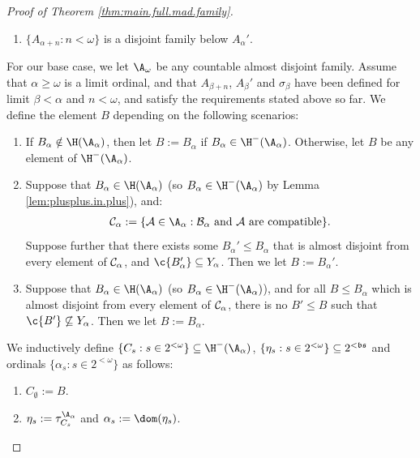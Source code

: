 \documentclass[11pt,reqno]{amsart}
\begin{document}
\begin{proof}[Proof of Theorem \ref{thm:main.full.mad.family}]
\begin{enumerate}
        \item $\{A_{\alpha+n} : n < \omega\}$ is a disjoint family below $A_\alpha'$.
    \end{enumerate}
    For our base case, we let $\A_\omega$ be any countable almost disjoint family. Assume that $\alpha \geq \omega$ is a limit ordinal, and that $A_{\beta+n}$, $A_\beta'$ and $\sigma_\beta$ have been defined for limit $\beta < \alpha$ and $n < \omega$, and satisfy the requirements stated above so far. We define the element $B$ depending on the following scenarios:
    \begin{enumerate}[label=(\alph*)]
        \item If $B_\alpha \notin \H(\A_\alpha)$, then let $B := B_\alpha$ if $B_\alpha \in \H^-(\A_\alpha)$. Otherwise, let $B$ be any element of $\H^-(\A_\alpha)$.

        \item Suppose that $B_\alpha \in \H(\A_\alpha)$ (so $B_\alpha \in \H^-(\A_\alpha)$ by Lemma \ref{lem:plusplus.in.plus}), and:
        \begin{align*}
            \cal{C}_\alpha := \{A \in \A_\alpha : B_\alpha \text{ and } A \text{ are compatible}\}.
        \end{align*}
        Suppose further that there exists some $B_\alpha' \leq B_\alpha$ that is almost disjoint from every element of $\cal{C}_\alpha$, and $\c{B_\alpha'} \subseteq Y_\alpha$. Then we let $B := B_\alpha'$.

        \item Suppose that $B_\alpha \in \H(\A_\alpha)$ (so $B_\alpha \in \H^-(\A_\alpha)$), and for all $B \leq B_\alpha$ which is almost disjoint from every element of $\cal{C}_\alpha$, there is no $B' \leq B$ such that $\c{B'} \not\subseteq Y_\alpha$. Then we let $B := B_\alpha$.
    \end{enumerate}
    We inductively define $\{C_s : s \in 2^{<\omega}\} \subseteq \H^-(\A_\alpha)$, $\{\eta_s : s \in 2^{<\omega}\} \subseteq 2^{<\frak{bs}}$ and ordinals $\{\alpha_s : s \in 2^{<\omega}\}$ as follows:
    \begin{enumerate}
        \item $C_\emptyset := B$.

        \item $\eta_s := \tau_{C_s}^{\A_\alpha}$ and $\alpha_s := \dom(\eta_s)$.


\end{enumerate}
\end{proof}
\end{document}
